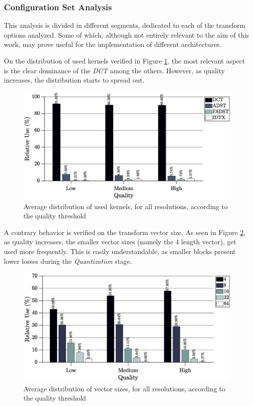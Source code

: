 \subsubsection{Configuration Set Analysis}

This analysis is divided in different segments, dedicated to each of the transform options analyzed. Some of which, although not entirely relevant to the aim of this work, may prove useful for the implementation of different architectures.

On the distribution of used kernels verified in Figure \ref{fig:kernelavg}, the most relevant aspect is the clear dominance of the \emph{DCT} among the others. However, as quality increases, the distribution starts to spread out.

\begin{figure}[!htpb]
    \centering
    \includegraphics[width=\textwidth]{Sections/3Transforms/Images/kernelAvg.eps}
    \caption{Average distribution of used kernels, for all resolutions, according to the quality threshold}
    \label{fig:kernelavg}
\end{figure}

A contrary behavior is verified on the transform vector size. As seen in Figure \ref{fig:sizeavg}, as quality increases, the smaller vector sizes (namely the $4$ length vector), get used more frequently. This is easily understandable, as smaller blocks present lower losses during the \emph{Quantization} stage. 

\begin{figure}[!htpb]
    \centering
    \includegraphics[width=\textwidth]{Sections/3Transforms/Images/vectSizAvg.eps}
    \caption{Average distribution of vector sizes, for all resolutions, according to the quality threshold}
    \label{fig:sizeavg}
\end{figure}

